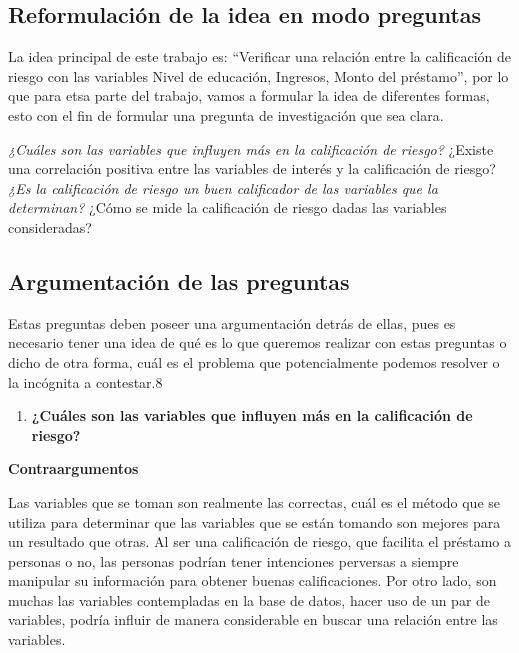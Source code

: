 \documentclass[
  letterpaper,
  DIV=11,
  numbers=noendperiod]{scrreprt}
\providecommand{\tightlist}{%
  \setlength{\itemsep}{0pt}\setlength{\parskip}{0pt}}\usepackage{longtable,booktabs,array}
\begin{document}
\subsection{Reformulación de la idea en modo
preguntas}\label{reformulaciuxf3n-de-la-idea-en-modo-preguntas}

La idea principal de este trabajo es: ``Verificar una relación entre la
calificación de riesgo con las variables Nivel de educación, Ingresos,
Monto del préstamo'', por lo que para etsa parte del trabajo, vamos a
formular la idea de diferentes formas, esto con el fin de formular una
pregunta de investigación que sea clara.

\emph{¿Cuáles son las variables que influyen más en la calificación de
riesgo? }¿Existe una correlación positiva entre las variables de interés
y la calificación de riesgo? \emph{¿Es la calificación de riesgo un buen
calificador de las variables que la determinan? }¿Cómo se mide la
calificación de riesgo dadas las variables consideradas?

\subsection{Argumentación de las
preguntas}\label{argumentaciuxf3n-de-las-preguntas}

Estas preguntas deben poseer una argumentación detrás de ellas, pues es
necesario tener una idea de qué es lo que queremos realizar con estas
preguntas o dicho de otra forma, cuál es el problema que potencialmente
podemos resolver o la incógnita a contestar.8

\begin{enumerate}
\def\labelenumi{\arabic{enumi}.}
\tightlist
\item
  \textbf{¿Cuáles son las variables que influyen más en la calificación
  de riesgo?}
\end{enumerate}

\textbf{Contraargumentos}

Las variables que se toman son realmente las correctas, cuál es el
método que se utiliza para determinar que las variables que se están
tomando son mejores para un resultado que otras. Al ser una calificación
de riesgo, que facilita el préstamo a personas o no, las personas
podrían tener intenciones perversas a siempre manipular su información
para obtener buenas calificaciones. Por otro lado, son muchas las
variables contempladas en la base de datos, hacer uso de un par de
variables, podría influir de manera considerable en buscar una relación
entre las variables.
\end{document}
